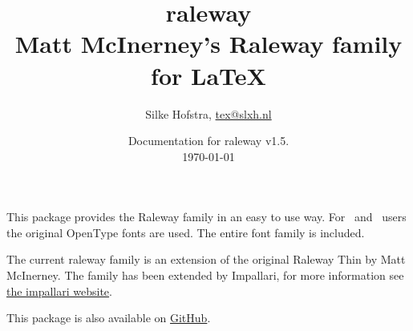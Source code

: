 \documentclass[10pt,a4paper,english]{article}
\title{\bfseries
	\Huge raleway\\
	\Large Matt McInerney’s Raleway family for \LaTeX
}
\author{Silke Hofstra, \href{mailto:tex@slxh.nl}{tex@slxh.nl}}
\date{Documentation for raleway v1.5.\\ \today}
\begin{document}
\maketitle
\begin{multicols}{2}
This package provides the Raleway family in an easy to use way. For \XeLaTeX\ and \LuaLaTeX\ users the original OpenType fonts are used. The entire font family is included.

The current raleway family is an extension of the original Raleway Thin by Matt McInerney. The family has been extended by Impallari, for more information see \href{http://www.impallari.com/projects/overview/matt-mcinerneys-raleway-family}{the impallari website}.

This package is also available on \href{https://github.com/silkeh/latex-raleway}{GitHub}.


\end{multicols}
\end{document}

